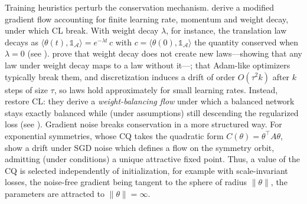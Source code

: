 \documentclass[mathematics,review,submit,moreauthors]{Definitions/mdpi}
\begin{document}
Training heuristics perturb the conservation mechanism.
\citet{kunin2020} derive a modified gradient flow accounting for finite learning rate, momentum and weight decay, under which CL break.
With weight decay $\lambda$, for instance, the translation law decays as $\langle\theta(t),\mathbb{1}_{\mathcal{A}}\rangle=e^{-\lambda t}\,c$ with $c=\langle\theta(0),\mathbb{1}_{\mathcal{A}}\rangle$ the quantity conserved when $\lambda=0$ (see ).
\citet{marcotte2025p4icml} prove that weight decay does not create new laws---showing that any law under weight decay maps to a law without it---; that Adam-like optimizers typically break them, and discretization induces a drift of order $O(\tau^2 k)$ after $k$ steps of size $\tau$, so laws hold approximately for small learning rates.
Instead, \citet{saul2023} restore CL: they derive a \emph{weight-balancing flow} under which a balanced network stays exactly balanced while (under assumptions) still descending the regularized loss (see ).
Gradient noise breaks conservation in a more structured way.
For exponential symmetries, whose CQ takes the quadratic form $C(\theta)=\theta^\top A\theta$, \citet{ziyin2024a} show a  drift under SGD noise which defines a flow on the symmetry orbit, admitting (under conditions) a unique attractive fixed point.
Thus, a value of the CQ is selected independently of initialization, for example with scale-invariant losses, the noise-free gradient being tangent to the sphere of radius $\lVert\theta\rVert$, the parameters are attracted to $\lVert\theta\rVert=\infty$.
\end{document}
